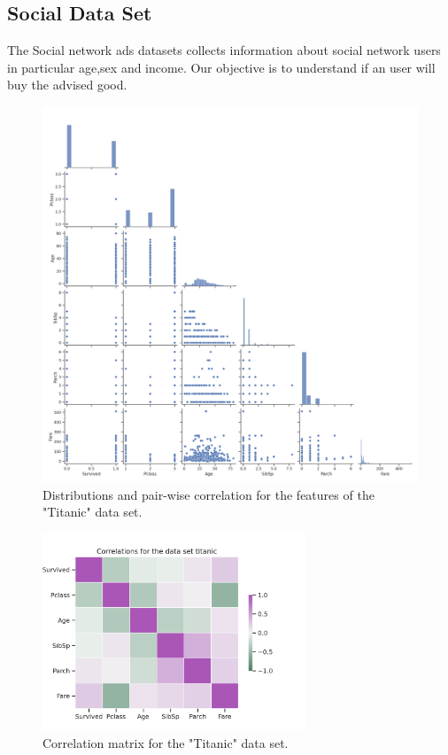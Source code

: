 \documentclass{article}
\begin{document}
\subsection{Social Data Set}
The Social network ads datasets collects information about social network users in particular age,sex and income. Our objective is to understand if an user will buy the advised good.

\begin{figure}[h!]
	\centering
	\includegraphics[width=\textwidth]{../plots/titanic_pairplot.png}
	\caption{ Distributions and pair-wise correlation for the features of the "Titanic" data set.}
	\label{pairplot_income}
\end{figure}


\begin{figure}[h!]
	\centering
	\includegraphics[width=0.7\textwidth]{../plots/titanic_correlations.png}
	\caption{Correlation matrix for the "Titanic" data set. }
	\label{correlation_income}
\end{figure}
\end{document}
